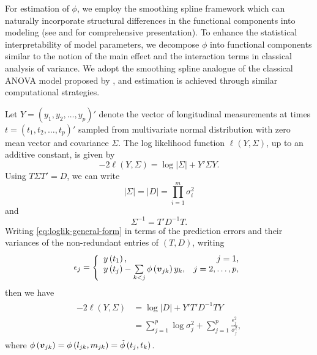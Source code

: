 \bigskip

For estimation of $\phi$, we employ the smoothing spline framework which can naturally incorporate structural differences in the functional components into modeling (see \cite{kimeldorf1971some} and \cite{wahba1990spline} for comprehensive presentation). To enhance the statistical interpretability of model parameters, we decompose $\phi$ into functional components similar to the notion of the main effect and the interaction terms in classical analysis of variance. We adopt the smoothing spline analogue of the classical ANOVA model proposed by \cite{gu2013smoothing}, and estimation is achieved through similar computational strategies.

\bigskip

Let $Y = \left(y_1, y_2, \dots, y_p \right)'$ denote the vector of longitudinal measurements at times $t = \left(t_1, t_2, \dots, t_p\right)'$ sampled from multivariate normal distribution with zero mean vector and covariance $\Sigma$. The log likelihood function $\ell \left( Y, \Sigma \right)$, up to an additive constant, is given by 
\begin{equation} \label{eq:loglik-general-form}
-2\ell\left( Y, \Sigma \right) = \log \vert \Sigma \vert + Y' \Sigma Y.
\end{equation}
\noindent
Using $T \Sigma T' = D$, we can write 
\[
\vert \Sigma\vert = \vert D \vert = \prod_{i = 1}^m \sigma_i^2
\]
\noindent
and 
\[
\Sigma^{-1} = T' D^{-1} T.
\]
Writing \ref{eq:loglik-general-form} in terms of the prediction errors and their variances of the non-redundant entries of $\left(T , D\right)$, writing 
\begin{equation} \label{eq:loglik-cholesky-form}
\epsilon_j = \left\{\begin{array}{lr}y\left(t_1\right), & j = 1, \\
y\left(t_j\right) - \sum\limits_{k < j} \phi\left(\mbox{\boldmath $v$}_{jk}\right) y_k, & j= 2, \dots, p, \\
\end{array} \right.
\end{equation}
\noindent
then we have
\begin{align}
\begin{split} \label{eq:loglik-cholesky-form}
-2\ell\left( Y, \Sigma \right) &= \log \vert D \vert + Y' T' D^{-1} T Y \\
&= \sum_{j = 1}^p \log \sigma_j^2  + \sum_{j = 1}^p \frac {\epsilon_j^2}{\sigma_j^2},
\end{split}
\end{align}
\noindent
where $\phi\left(\mbox{\boldmath $v$}_{jk}\right) = \phi\left(l_{jk},m_{jk}\right) = \tilde{\phi}\left(t_j,t_k\right)$.


